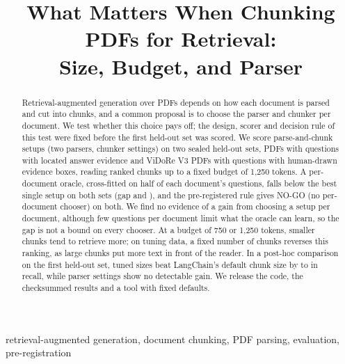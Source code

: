 \documentclass[conference]{IEEEtran}
\begin{document}
\title{What Matters When Chunking PDFs for Retrieval:\\Size, Budget, and Parser}
\author{
}
\maketitle

\begin{abstract}
Retrieval-augmented generation over PDFs depends on how each document is
parsed and cut into chunks, and a common proposal is to choose the parser and
chunker per document. We test whether this choice pays off; the
design, scorer and decision rule of this test were fixed before the first
held-out set was scored.
We score \RQoneSetups{} parse-and-chunk setups (two parsers,
\RQonePrimarySettings{} chunker settings) on two sealed held-out sets,
\RQoneDocuments{} PDFs with \RQoneQuestions{} questions with located answer evidence and
\RQoneHTwoDropRuleDocuments{} ViDoRe V3 PDFs with
\RQoneHTwoDropRuleQuestions{} questions with human-drawn evidence boxes, reading ranked chunks up to
a fixed budget of 1,250 tokens. A per-document oracle, cross-fitted on half of
each document's questions, falls below the best single setup on both sets
(gap \RQonePrimaryGap{} \RQonePrimaryGapCI{} and \RQoneHTwoDropRuleGap{}
\RQoneHTwoDropRuleGapCI{}), and the pre-registered rule gives NO-GO (no per-document chooser) on both.
We find no evidence of a gain from choosing a setup per document, although
few questions per document limit what the oracle can learn, so the gap is not
a bound on every chooser. At a budget of
750 or 1,250 tokens, smaller chunks tend to retrieve more; on tuning data,
a fixed number of chunks reverses this ranking, as large chunks put more text
in front of the reader. In a post-hoc comparison on the first held-out set,
tuned sizes beat LangChain's default chunk size by \RQfiveBLangchainRecursivePdfplumberDiff{}
to \RQfiveBLangchainRecursiveDoclingDiff{} in recall, while parser settings
show no detectable gain. We release the code, the checksummed results and a tool
with fixed defaults.
\end{abstract}

\begin{IEEEkeywords}
retrieval-augmented generation, document chunking, PDF parsing, evaluation, pre-registration
\end{IEEEkeywords}
\end{document}
